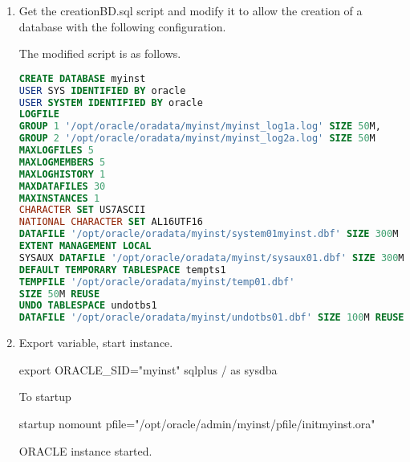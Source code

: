 \documentclass{article}
\begin{document}
\begin{enumerate}
\begin{lstlisting}[language=python]
###########################################
# Miscellaneous
###########################################
compatible=18.0.0
diagnostic_dest=/opt/oracle
memory_target=429m
 
###########################################
# NLS
###########################################
nls_language="AMERICAN"
nls_territory="AMERICA"
 
###########################################
# Network Registration
###########################################
local_listener=LISTENER_ORCLCDB
 
###########################################
# Processes and Sessions
###########################################
processes=300
 
###########################################
# Security and Auditing
###########################################
audit_file_dest="/opt/oracle/admin/myinst/adump"
audit_trail=db
remote_login_passwordfile=EXCLUSIVE
 
###########################################
# Shared Server
###########################################
dispatchers="(PROTOCOL=TCP) (SERVICE=ORCLCDBXDB)"
        \end{lstlisting}
    \item Get the creationBD.sql script and modify it to allow the creation of a database with the following configuration.

        The modified script is as follows.
        \begin{lstlisting}[language=SQL]
CREATE DATABASE myinst
USER SYS IDENTIFIED BY oracle
USER SYSTEM IDENTIFIED BY oracle
LOGFILE
GROUP 1 '/opt/oracle/oradata/myinst/myinst_log1a.log' SIZE 50M,
GROUP 2 '/opt/oracle/oradata/myinst/myinst_log2a.log' SIZE 50M
MAXLOGFILES 5
MAXLOGMEMBERS 5
MAXLOGHISTORY 1
MAXDATAFILES 30
MAXINSTANCES 1
CHARACTER SET US7ASCII
NATIONAL CHARACTER SET AL16UTF16
DATAFILE '/opt/oracle/oradata/myinst/system01myinst.dbf' SIZE 300M REUSE
EXTENT MANAGEMENT LOCAL
SYSAUX DATAFILE '/opt/oracle/oradata/myinst/sysaux01.dbf' SIZE 300M REUSE
DEFAULT TEMPORARY TABLESPACE tempts1
TEMPFILE '/opt/oracle/oradata/myinst/temp01.dbf'
SIZE 50M REUSE
UNDO TABLESPACE undotbs1
DATAFILE '/opt/oracle/oradata/myinst/undotbs01.dbf' SIZE 100M REUSE AUTOEXTEND ON MAXSIZE UNLIMITED;
        \end{lstlisting}
    \item Export variable, start instance.
        \begin{commandshell}
            export ORACLE_SID="myinst"
            sqlplus / as sysdba
        \end{commandshell}
        To startup 
        \begin{sqlshell}
            startup nomount pfile="/opt/oracle/admin/myinst/pfile/initmyinst.ora"
        \end{sqlshell}
        \begin{messageshell}
ORACLE instance started.


\end{messageshell}
\end{enumerate}
\end{document}
